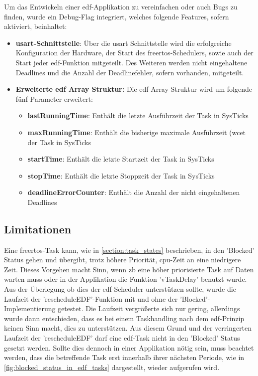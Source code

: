 \documentclass[../EDF Master Thesis.tex]{subfiles}
\begin{document}
    Um das Entwickeln einer \ac{edf}-Applikation zu vereinfachen oder auch Bugs zu finden, wurde ein Debug-Flag integriert, welches folgende Features, sofern aktiviert, beinhaltet:

    \begin{itemize}
        \item \textbf{\ac{usart}-Schnittstelle}: Über die \ac{usart} Schnittstelle wird die erfolgreiche Konfiguration der Hardware, der Start des \ac{freertos}-Schedulers, sowie auch der Start jeder \ac{edf}-Funktion mitgeteilt.
                                                 Des Weiteren werden nicht eingehaltene Deadlines und die Anzahl der Deadlinefehler, sofern vorhanden, mitgeteilt.
        \item \textbf{Erweiterte \ac{edf} Array Struktur:} Die \ac{edf} Array Struktur wird um folgende fünf Parameter erweitert:
        \begin{itemize}
            \item \textbf{lastRunningTime}: Enthält die letzte Ausführzeit der Task in SysTicks
            \item \textbf{maxRunningTime}: Enthält die bisherige maximale Ausführzeit (\ac{wcet} der Task in SysTicks
            \item \textbf{startTime}: Enthält die letzte Startzeit der Task in SysTicks
            \item \textbf{stopTime}: Enthält die letzte Stoppzeit der Task in SysTicks
            \item \textbf{deadlineErrorCounter}: Enthält die Anzahl der nicht eingehaltenen Deadlines
        \end{itemize}
    \end{itemize}

\subsection{Limitationen} \label{section:limitationen}

    Eine \ac{freertos}-Task kann, wie in \autoref{section:task_states} beschrieben, in den 'Blocked' Status gehen und übergibt, trotz höhere Priorität, \ac{cpu}-Zeit an eine niedrigere Zeit.
    Dieses Vorgehen macht Sinn, wenn \ac{zb} eine höher priorisierte Task auf Daten warten muss oder in der Applikation die Funktion 'vTaskDelay' benutzt wurde.
    Aus der Überlegung ob dies der \ac{edf}-Scheduler unterstützen sollte, wurde die Laufzeit der 'rescheduleEDF'-Funktion mit und ohne der 'Blocked'-Implementierung getestet.
    Die Laufzeit vergrößerte sich nur gering, allerdings wurde dann entschieden, dass es bei einem Taskhandling nach dem \ac{edf}-Prinzip keinen Sinn macht, dies zu unterstützen.
    Aus diesem Grund und der verringerten Laufzeit der 'rescheduleEDF' darf eine \ac{edf}-Task nicht in den 'Blocked' Status gesetzt werden.  
    Sollte dies dennoch in einer Applikation nötig sein, muss beachtet werden, dass die betreffende Task erst innerhalb ihrer nächsten Periode, wie in \autoref{fig:blocked_status_in_edf_tasks} dargestellt, wieder aufgerufen wird.
\end{document}
